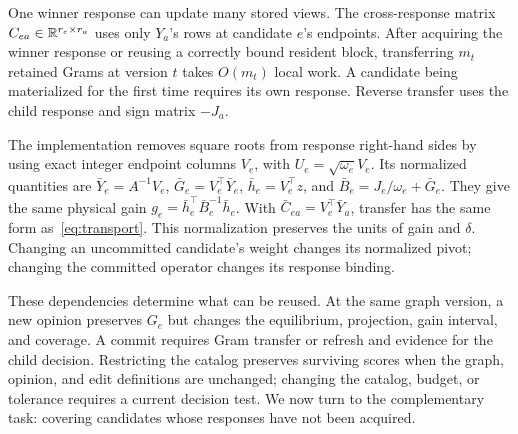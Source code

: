 One winner response can update many stored views. The cross-response matrix $C_{ea}\in\mathbb R^{r_e\times r_a}$ uses only $Y_a$'s rows at candidate $e$'s endpoints. After acquiring the winner response or reusing a correctly bound resident block, transferring $m_t$ retained Grams at version $t$ takes $O(m_t)$ local work. A candidate being materialized for the first time requires its own response. Reverse transfer uses the child response and sign matrix $-J_a$.

The implementation removes square roots from response right-hand sides by using exact integer endpoint columns $V_e$, with $U_e=\sqrt{\omega_e}V_e$. Its normalized quantities are $\bar Y_e=A^{-1}V_e$, $\bar G_e=V_e^\top\bar Y_e$, $\bar h_e=V_e^\top z$, and $\bar B_e=J_e/\omega_e+\bar G_e$. They give the same physical gain $g_e=\bar h_e^\top\bar B_e^{-1}\bar h_e$. With $\bar C_{ea}=V_e^\top\bar Y_a$, transfer has the same form as~\eqref{eq:transport}. This normalization preserves the units of gain and $\delta$. Changing an uncommitted candidate's weight changes its normalized pivot; changing the committed operator changes its response binding.

These dependencies determine what can be reused. At the same graph version, a new opinion preserves $G_e$ but changes the equilibrium, projection, gain interval, and coverage. A commit requires Gram transfer or refresh and evidence for the child decision. Restricting the catalog preserves surviving scores when the graph, opinion, and edit definitions are unchanged; changing the catalog, budget, or tolerance requires a current decision test. We now turn to the complementary task: covering candidates whose responses have not been acquired.
